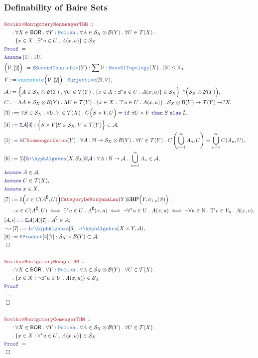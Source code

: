 \documentclass[12pt]{scrartcl}
\newcommand{\TYPE}[1]{\textcolor{NavyBlue}{\mathtt{#1}}}
\newcommand{\FUNC}[1]{\textcolor{Cerulean}{\mathtt{#1}}}
\newcommand{\LOGIC}[1]{\textcolor{Blue}{\mathtt{#1}}}
\newcommand{\THM}[1]{\textcolor{Maroon}{\mathtt{#1}}}
\renewcommand{\.}{\; . \;}
\newcommand{\de}{: \kern 0.1pc =}
\newcommand{\If}{\LOGIC{if} \;}
\newcommand{\Then}{ \; \LOGIC{then} \;}
\newcommand{\Else}{\; \LOGIC{else} \;}
\newcommand{\Theorem}[2]{& \THM{#1} \, :: \, #2 \\ & \Proof = \\ }
\newcommand{\NewLine}{\\ & \kern 1pc}
\newcommand{\Page}[1]{ \begin{align*} #1 \end{align*}   }
\newcommand{\NoProof}{ & \ldots \\ \EndProof}
\newcommand{\Intro}{\LOGIC{I}}
\newcommand{\Elim}{\LOGIC{E}}
\newcommand{\Nat}{\mathbb{N} }
\renewcommand{\c}{\complement}
\newcommand{\Say}[3]{& #1 \de #2 : #3, \\}
\newcommand{\Conclude}[3]{& #1 \de #2 : #3; \\}
\newcommand{\Derive}[3]{& \leadsto #1 \de #2 : #3, \\}
\newcommand{\Assume}[2]{& \LOGIC{Assume} \; #1 : #2, \\}
\newcommand{\AssumeIn}[2]{& \LOGIC{Assume} \; #1 \in #2, \\}
\newcommand{\QED}{\; \square}
\newcommand{\EndProof}{& \QED \\}
\newcommand{\Proof}{\LOGIC{Proof} \; }
\newcommand{\Surj}{\TYPE{Surjective}}
\newcommand{\SA}{\TYPE{\sigma \hyph Algebra}}
\newcommand{\A}{\mathcal{A}}
\newcommand{\B}{\mathcal{B}}
\newcommand{\T}{\mathcal{T}}
\newcommand{\V}{\mathcal{V}}
\newcommand{\Polish}{\TYPE{Polish}}
\newcommand{\BP}{\mathbf{BP}}
\newcommand{\BOR}{\mathsf{BOR}}
\renewcommand{\S}{\mathcal{S}}
\begin{document}
\subsubsection{Definability of Baire Sets}
\Page{
		\Theorem{NovikovMontgomeryNonmeagerTHM}
		{
			\NewLine :			
			\forall X \in \BOR \.
			\forall Y : \Polish \.
			\forall A \in \S_X \otimes \B(Y) \.
			\forall U \in \T(X) \. \NewLine \.
			\{ x \in X : \exists^* u \in U \. A(x,u)  \} \in \S_X		
		}
		\Assume{[1]}{\exists U}
		\Say{\Big(\V,[2]\Big)}{\Elim \TYPE{SecondCountable}(Y)}
		{
			\sum \V : \TYPE{BaseOfTopology}(X) \. |\V| \le \aleph_0
		}
		\Say{V}{\FUNC{enumerate}\Big(\V,[2]\Big)}{\Surj(\Nat,\V)}
		\Say{\A}
		{
			\Big\{
				A \in  \S_X \otimes \B(Y) \. 
				\forall U \in \T(Y) \.				
				\{ x \in X : \exists^* u \in U \. A(x,u)   \} \in \S_X
			\Big\}
		}
		{
			?\Big(\S_X \otimes \B(Y)\Big)
		}
		\Say{C}
		{
			\Lambda A \in \S_X \otimes \B(Y) \.
			\Lambda U \in \T(Y) \.
			\{ x \in X : \exists^* u \in U \. A(x,u)   \}
		}{
			\S_X \otimes \B(Y) \to \T(Y) \to ?X
		}
		\Say{[3]}
		{
		}
		{
			\forall S \in \S_X \.
			\forall U,V \in \T(X) \.
			C\Big( S \times V, U\Big) = \If \exists U \times V \Then S \Else \emptyset
		}
		\Say{[4]}{\Elim \A [3]}
		{
			\Big\{ S \times V | S \in \S_X, V \in \T(Y) \Big\} \subset \A
		}
		\Say{[5]}{\Elim C \THM{NonmeagerUnion}(Y)}
		{
			\forall A : \Nat \to \S_X \otimes \B(Y) \.
			\forall U \in \T(Y) \.
			C\left( \bigcup^\infty_{n=1} A_n, U \right) =
			\bigcup^\infty_{n=1} C(A_n,U)
		}
		\Say{[6]}{[5]\Elim \SA(X,\S_X) \Elim \A}
		{
			\forall A : \Nat \to \A \.
			\bigcup^\infty_{n=1} A_n \in \A
		}
		\AssumeIn{A}{\A}
		\AssumeIn{U}{\T(X)}
		\AssumeIn{x}{X}
		\Say{[7]}{
			\Elim \Big(x \in  C(A^\c,U)\Big)
			\THM{CategoryDeMorganaLaw}(Y)
			\Elim \BP\Big(Y,\sigma_{1,x}(S)\Big)
		}
		{
			\NewLine :			
			x \in  C(A^\c,U) 
			\iff
			\exists^* u \in U \.   A^\c(x,u) \iff
			\neg \forall^* u \in U \. A(x,u) \iff
			\neg \forall n \in \Nat \. \exists^* v \in V_n \. A(x,v)
		}
		\Conclude{[A.*]}{\Elim \A(A)[7]}{A^\c \in \A}
		\Derive{[7]}{\Intro \SA [6]}{\SA(X\times Y,\A)}
		\Conclude{[8]}{\Elim \TYPE{Product}[4][7] }
		{
			\S_X \times \B(Y) \subset \A
		}
		\EndProof
		\\
		\Theorem{NovikovMontgomeryMeagerTHM}
		{
			\NewLine :			
			\forall X \in \BOR \.
			\forall Y : \Polish \.
			\forall A \in \S_X \otimes \B(Y) \.
			\forall U \in \T(X) \. \NewLine \.
			\{ x \in X : \neg\exists^* u \in U \. A(x,u)  \} \in \S_X		
		}
		\NoProof
		\\
		\Theorem{NovikovMontgomeryComeagerTHM}
		{
			\NewLine :			
			\forall X \in \BOR \.
			\forall Y : \Polish \.
			\forall A \in \S_X \otimes \B(Y) \.
			\forall U \in \T(X) \. \NewLine \.
			\{ x \in X : \forall^* u \in U \. A(x,u)  \} \in \S_X		
		}
		\EndProof
}
\newpage
\end{document}
